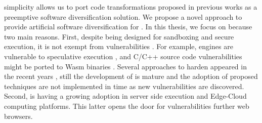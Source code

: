 \wasm simplicity allows us to port code transformations proposed in previous works as a preemptive software diversification solution.
We propose a novel approach to provide artificial software diversification for \wasm.
In this thesis, we focus on \wasm because two main reasons. First,
despite being designed for sandboxing and secure execution, it is not exempt from vulnerabilities \cite{WebAssemblySecurity}.
For example, \wasm engines are vulnerable to speculative execution \cite{Narayan2021Swivel}, and C/C++ source code vulnerabilities might be ported to Wasm binaries \cite{DeRoover2022}.  
Several approaches to harden \wasm appeared in the recent years \citationneeded, still the development of \wasm is mature and the adoption of proposed techniques are not implemented in time as new vulnerabilities are discovered.
Second, \wasm is having a growing adoption in server side execution and Edge-Cloud computing platforms.
This latter opens the door for vulnerabilities further web browsers.










